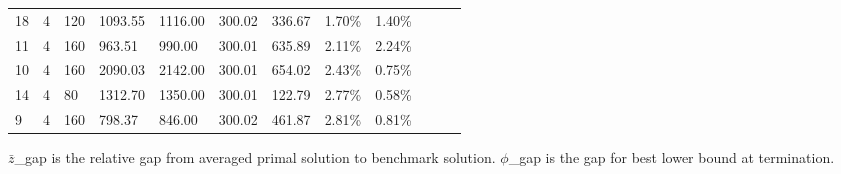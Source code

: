 \documentclass[../main]{subfiles}
\begin{document}
\begin{longtable}{l|ll|lll|lll|lll}
   18                  & 4                          & 120                        & 1093.55                   & 1116.00  & 300.02              & 336.67  & 1.70\%  & 1.40\% \\
   11                  & 4                          & 160                        & 963.51                    & 990.00   & 300.01              & 635.89  & 2.11\%  & 2.24\% \\
   10                  & 4                          & 160                        & 2090.03                   & 2142.00  & 300.01              & 654.02  & 2.43\%  & 0.75\% \\
   14                  & 4                          & 80                         & 1312.70                   & 1350.00  & 300.01              & 122.79  & 2.77\%  & 0.58\% \\
   9                   & 4                          & 160                        & 798.37                    & 846.00   & 300.02              & 461.87  & 2.81\%  & 0.81\% \\
   \bottomrule
\end{longtable}

\small
$\bar z$\_gap is the relative gap from averaged primal solution to benchmark solution.
$\phi$\_gap is the gap for best lower bound at termination.

\normalsize
\end{document}
